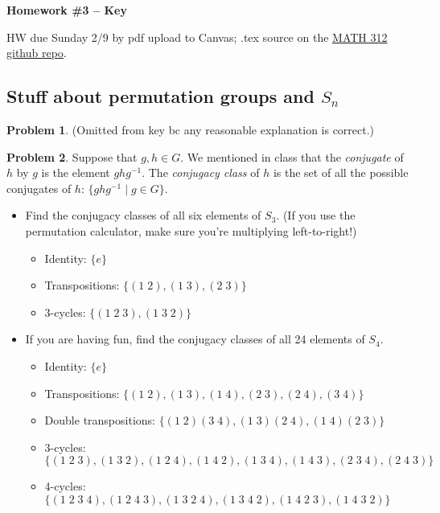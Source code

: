 \documentclass[12pt]{article}
\theoremstyle{definition} %
\newtheorem{problem}{Problem}
\newcommand{\Alert}[1]{\textcolor{xRed}{#1}}
\newcommand\inv{^{-1}} %
\newenvironment{red}{\color{red}}{\ignorespacesafterend}
\renewcommand{\section}[1]{\begin{center} \textbf{#1} \\\end{center}}
\begin{document}
\section{Homework \#3 -- \Alert{Key}} %

HW due Sunday 2/9 by pdf upload to Canvas; .tex source on the \href{https://github.com/rhinopotamus/math312}{MATH 312 github repo}.

\subsection*{Stuff about permutation groups and $S_n$}

\begin{problem} (Omitted from key bc any reasonable explanation is correct.)
\end{problem}

\begin{problem}
    Suppose that $g, h \in G$. We mentioned in class that the \textit{conjugate} of $h$ by $g$ is the element $ghg\inv$. The \textit{conjugacy class} of $h$ is the set of all the possible conjugates of $h$: $\{ghg\inv \mid g\in G\}.$
    \begin{itemize}
        \item Find the conjugacy classes of all six elements of $S_3$. (If you use the permutation calculator, make sure you're multiplying left-to-right!) 
        \begin{red}
            \begin{itemize}
                \item Identity: $\{e\}$
                \item Transpositions: $\{(1\;2), (1\;3), (2\;3)\}$
                \item 3-cycles: $\{(1\;2\;3), (1\;3\;2)\}$
            \end{itemize}
        \end{red}
        \item If you are having fun, find the conjugacy classes of all 24 elements of $S_4$.
        \begin{red}
            \begin{itemize}
                \item Identity: $\{e\}$
                \item Transpositions: $\{(1\;2), (1\;3), (1\;4), (2\;3), (2\;4), (3\;4)\}$
                \item Double transpositions: $\{(1\;2)(3\;4), (1\;3)(2\;4), (1\;4)(2\;3)\}$
                \item 3-cycles: $\{(1\;2\;3), (1\;3\;2), (1\;2\;4), (1\;4\;2),
                (1\;3\;4),(1\;4\;3),(2\;3\;4),(2\;4\;3)\}$
                \item 4-cycles: $\{(1\;2\;3\;4), (1\;2\;4\;3), (1\;3\;2\;4), (1\;3\;4\;2), (1\;4\;2\;3), (1\;4\;3\;2)\}$
            \end{itemize}
        \end{red}
    \end{itemize}
\end{problem}
\end{document}
